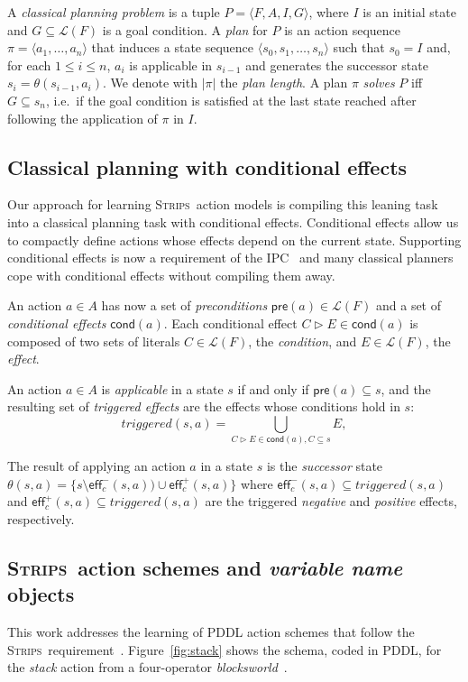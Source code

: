 \documentclass[letterpaper]{article} %
\newcommand{\tup}[1]{{\langle #1 \rangle}}
\newcommand{\pre}{\mathsf{pre}}     %
\newcommand{\eff}{\mathsf{eff}}     %
\newcommand{\cond}{\mathsf{cond}}   %
\newcommand{\strips}{\textsc{Strips}}     %
\begin{document}
A {\em classical planning problem} is a tuple $P=\tup{F,A,I,G}$, where $I$ is an initial state and $G\subseteq\mathcal{L}(F)$ is a goal condition. A {\em plan} for $P$ is an action sequence $\pi=\tup{a_1, \ldots, a_n}$ that induces a state sequence $\tup{s_0, s_1, \ldots, s_n}$ such that $s_0=I$ and, for each {\small $1\leq i\leq n$}, $a_i$ is applicable in $s_{i-1}$ and generates the successor state $s_i=\theta(s_{i-1},a_i)$. We denote with $|\pi|$ the {\em plan length}. A plan $\pi$ {\em solves} $P$ iff $G\subseteq s_n$, i.e.~if the goal condition is satisfied at the last state reached after following the application of $\pi$ in $I$. 


\subsection{Classical planning with conditional effects}
Our approach for learning \strips\ action models is compiling this leaning task into a classical planning task with conditional effects. Conditional effects allow us to compactly define actions whose effects depend on the current state. Supporting conditional effects is now a requirement of the IPC~\cite{vallati:IPC:AIM2015} and many classical planners cope with conditional effects without compiling them away.

An action $a\in A$ has now a set of {\em preconditions} $\pre(a)\in\mathcal{L}(F)$ and a set of {\em conditional effects} $\cond(a)$. Each conditional effect $C\rhd E\in\cond(a)$ is composed of two sets of literals $C\in\mathcal{L}(F)$, the {\em condition}, and $E\in\mathcal{L}(F)$, the {\em effect}.

An action $a\in A$ is {\em applicable} in a state $s$ if and only if $\pre(a)\subseteq s$, and the resulting set of {\em triggered effects} are the effects whose conditions hold in $s$:
\[
triggered(s,a)=\bigcup_{C\rhd E\in\cond(a),C\subseteq s} E,
\]

The result of applying an action $a$ in a state $s$ is the {\em successor} state $\theta(s,a)=\{s\setminus\eff_c^-(s,a))\cup\eff_c^+(s,a)\}$ where $\eff_c^-(s,a)\subseteq triggered(s,a)$ and $\eff_c^+(s,a)\subseteq triggered(s,a)$ are the triggered {\em negative} and {\em positive} effects, respectively.


\subsection{\strips\ action schemes and {\em variable name} objects}
This work addresses the learning of PDDL action schemes that follow the \strips\ requirement~\cite{mcdermott1998pddl,fox2003pddl2}. Figure~\ref{fig:stack} shows the schema, coded in PDDL, for the {\em stack} action from a four-operator {\em blocksworld}~\cite{slaney2001blocks}.
\end{document}
